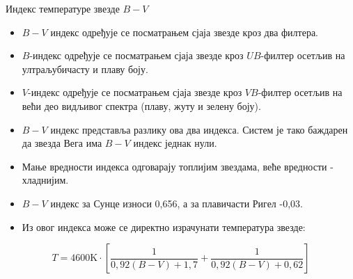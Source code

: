 \documentclass[aspectratio=169, xcolor=table, 10pt]{beamer}
\theoremstyle{definition}
\begin{document}
\begin{frame}{Индекс температуре звезде $B-V$}
  \begin {itemize}
    \item $B-V$ индекс одређује се посматрањем сјаја звезде кроз два филтера.
    \item $B$-индекс одређује се посматрањем сјаја звезде кроз $UB$-филтер осетљив на ултраљубичасту и плаву боју.
    \item $V$-индекс одређује се посматрањем сјаја звезде кроз $VB$-филтер осетљив на већи део видљивог спектра (плаву, жуту и зелену боју).
    \item $B-V$ индекс представља разлику ова два индекса. Систем је тако баждарен да звезда Вега има $B-V$ индекс једнак нули.
    \item Мање вредности индекса одговарају топлијим звездама, веће вредности - хладнијим.
    \item $B-V$ индекс за Сунце износи 0,656, а за плавичасти Ригел -0,03.
    \item Из овог индекса може се директно израчунати температура звезде:
  \end {itemize}
  \begin{equation*}
  T=4600\text{K}\cdot\left[\frac{1}{0,92(B-V)+1,7}+\frac{1}{0,92(B-V)+0,62}\right]
  \end{equation*}
\end{frame}
\end{document}
